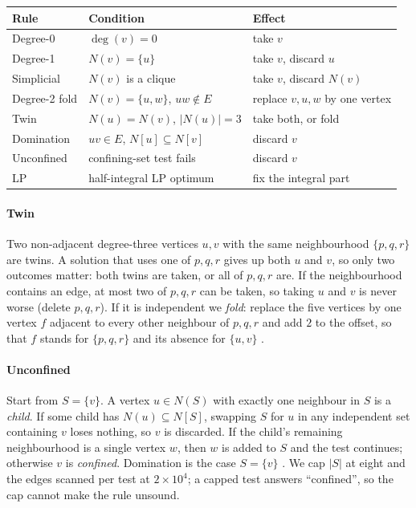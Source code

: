 \documentclass[pdflatex,sn-mathphys-num]{sn-jnl}
\theoremstyle{thmstyleone}%
\theoremstyle{thmstyletwo}%
\renewenvironment{table}[1][]{\begin{tableorg}[#1]\begin{center}\tablebodyfont}{\end{center}\end{tableorg}}
\begin{document}
\begin{table}[htbp]
\centering
\caption{The reduction rules used. The unconfined rule is that of
\citet{xiao2017}; the LP rule is that of \citet{nemhauser1975}.}
\label{tab:rules}
\small
\begin{tabular}{lll}
\toprule
Rule & Condition & Effect \\
\midrule
Degree-0 & $\deg(v)=0$ & take $v$ \\
Degree-1 & $N(v)=\{u\}$ & take $v$, discard $u$ \\
Simplicial & $N(v)$ is a clique & take $v$, discard $N(v)$ \\
Degree-2 fold & $N(v)=\{u,w\}$, $uw \notin E$ & replace $v,u,w$ by one vertex \\
Twin & $N(u)=N(v)$, $|N(u)|=3$ & take both, or fold \\
Domination & $uv \in E$, $N[u] \subseteq N[v]$ & discard $v$ \\
Unconfined & confining-set test fails & discard $v$ \\
LP & half-integral LP optimum & fix the integral part \\
\bottomrule
\end{tabular}
\end{table}

\paragraph{Twin} Two non-adjacent degree-three vertices $u,v$ with the same
neighbourhood $\{p,q,r\}$ are twins. A solution that uses one of $p,q,r$ gives up
both $u$ and $v$, so only two outcomes matter: both twins are taken, or all of
$p,q,r$ are. If the neighbourhood contains an edge, at most two of $p,q,r$ can be
taken, so taking $u$ and $v$ is never worse (delete $p,q,r$). If it is independent
we \emph{fold}: replace the five vertices by one vertex $f$ adjacent to every other
neighbour of $p,q,r$ and add $2$ to the offset, so that $f$ stands for $\{p,q,r\}$
and its absence for $\{u,v\}$ \citep{akiba2016}.

\paragraph{Unconfined} Start from $S=\{v\}$. A vertex $u\in N(S)$ with exactly one
neighbour in $S$ is a \emph{child}. If some child has $N(u)\subseteq N[S]$, swapping
$S$ for $u$ in any independent set containing $v$ loses nothing, so $v$ is
discarded. If the child's remaining neighbourhood is a single vertex $w$, then $w$
is added to $S$ and the test continues; otherwise $v$ is \emph{confined}. Domination
is the case $S=\{v\}$ \citep{xiao2013,xiao2017}. We cap $|S|$ at eight and the edges
scanned per test at $2\times10^4$; a capped test answers ``confined'', so the cap
cannot make the rule unsound.
\end{document}
